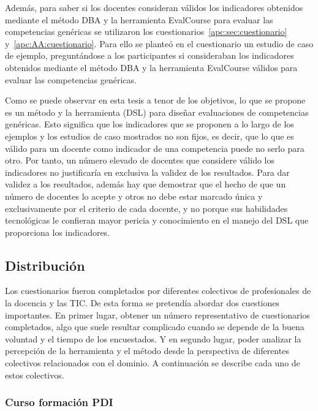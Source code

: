 Además, para saber si los docentes consideran válidos los indicadores obtenidos mediante el método DBA y la herramienta EvalCourse para evaluar las competencias genéricas se utilizaron los cuestionarios~\ref{apc:sec:cuestionario} y~\ref{apc:AA:cuestionario}. Para ello se planteó en el cuestionario un estudio de caso de ejemplo, preguntándose a los participantes si consideraban los indicadores obtenidos mediante el método DBA y la herramienta EvalCourse válidos para evaluar las competencias genéricas.%

Como se puede observar en esta tesis a tenor de los objetivos, lo que se propone es un método y la herramienta (DSL) para diseñar evaluaciones de competencias genéricas. Esto significa que los indicadores que se proponen a lo largo de los ejemplos y los estudios de caso mostrados no son fijos, es decir, que lo que es válido para un docente como indicador de una competencia puede no serlo para otro. Por tanto, un número elevado de docentes que considere válido los indicadores no justificaría en exclusiva la validez de los resultados. Para dar validez a los resultados, además hay que demostrar que el hecho de que un número de docentes lo acepte y otros no debe estar marcado única y exclusivamente por el criterio de cada docente, y no porque sus habilidades tecnológicas le confieran mayor pericia y conocimiento en el manejo del DSL que proporciona los indicadores.

\subsection{Distribución} \label{eva:participantes}

Los cuestionarios fueron completados por diferentes colectivos de profesionales de la docencia y las TIC. De esta forma se pretendía abordar dos cuestiones importantes. En primer lugar, obtener un número representativo de cuestionarios completados, algo que suele resultar complicado cuando se depende de la buena voluntad y el tiempo de los encuestados. Y en segundo lugar, poder analizar la percepción de la herramienta y el método desde la perspectiva de diferentes colectivos relacionados con el dominio. A continuación se describe cada uno de estos colectivos.

	\subsubsection*{Curso formación PDI}

